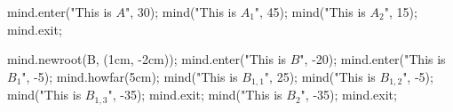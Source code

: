 \usemodule[mindmap]
\startMPpage
mind.enter("This is $A$", 30);
    mind("This is $A_1$", 45);
    mind("This is $A_2$", 15);
mind.exit;

mind.newroot(B, (1cm, -2cm));
mind.enter("This is $B$", -20);
    mind.enter("This is $B_{1}$", -5);
        mind.howfar(5cm);
        mind("This is $B_{1,1}$", 25);
        mind("This is $B_{1,2}$", -5);
        mind("This is $B_{1,3}$", -35);
    mind.exit;
    mind("This is $B_2$", -35);
mind.exit;
\stopMPpage
